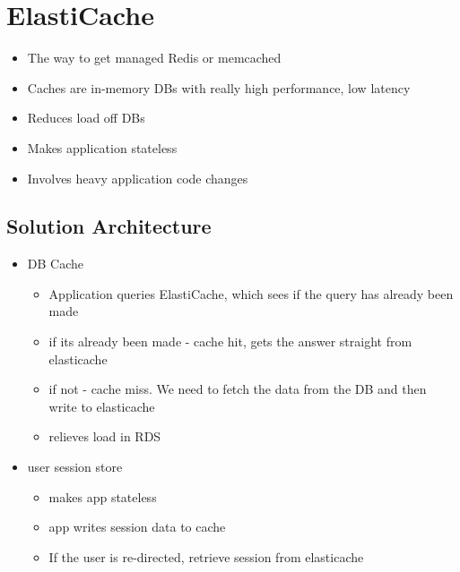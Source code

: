 \documentclass[]{scrartcl}
\begin{document}
\section{ElastiCache}
\begin{itemize}
	\item The way to get managed Redis or memcached
	\item Caches are in-memory DBs with really high performance, low latency
	\item Reduces load off DBs
	\item Makes application stateless
	\item Involves heavy application code changes
\end{itemize}

\subsection{Solution Architecture}
\begin{itemize}
	\item DB Cache
	\begin{itemize}
		\item Application queries ElastiCache, which sees if the query has already been made
		\item if its already been made - cache hit, gets the answer straight from elasticache
		\item if not - cache miss. We need to fetch the data from the DB and then write to elasticache
		\item relieves load in RDS
	\end{itemize}
	\item user session store
	\begin{itemize}
		\item makes app stateless
		\item app writes session data to cache
		\item If the user is re-directed, retrieve session from elasticache
	\end{itemize}
\end{itemize}
\end{document}
